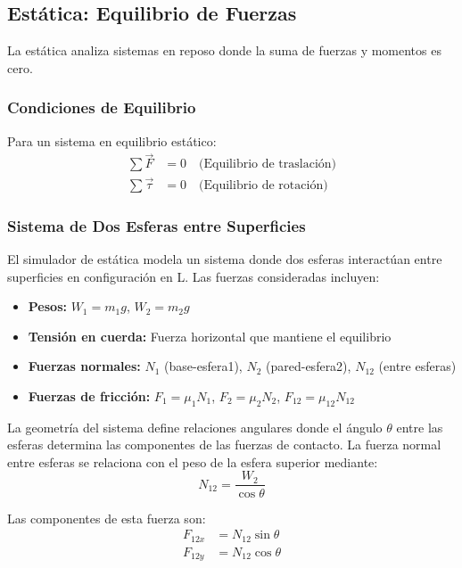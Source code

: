 \subsection{Estática: Equilibrio de Fuerzas}

La estática analiza sistemas en reposo donde la suma de fuerzas y momentos es cero.

\subsubsection{Condiciones de Equilibrio}
Para un sistema en equilibrio estático:
\begin{align}
\sum \vec{F} &= 0 \quad \text{(Equilibrio de traslación)} \\
\sum \vec{\tau} &= 0 \quad \text{(Equilibrio de rotación)}
\end{align}

\subsubsection{Sistema de Dos Esferas entre Superficies}
El simulador de estática modela un sistema donde dos esferas interactúan entre superficies en configuración en L. Las fuerzas consideradas incluyen:

\begin{itemize}
    \item \textbf{Pesos:} $W_1 = m_1 g$, $W_2 = m_2 g$
    \item \textbf{Tensión en cuerda:} Fuerza horizontal que mantiene el equilibrio
    \item \textbf{Fuerzas normales:} $N_1$ (base-esfera1), $N_2$ (pared-esfera2), $N_{12}$ (entre esferas)
    \item \textbf{Fuerzas de fricción:} $F_1 = \mu_1 N_1$, $F_2 = \mu_2 N_2$, $F_{12} = \mu_{12} N_{12}$
\end{itemize}

La geometría del sistema define relaciones angulares donde el ángulo $\theta$ entre las esferas determina las componentes de las fuerzas de contacto. La fuerza normal entre esferas se relaciona con el peso de la esfera superior mediante:
\begin{equation}
N_{12} = \frac{W_2}{\cos\theta}
\end{equation}

Las componentes de esta fuerza son:
\begin{align}
F_{12x} &= N_{12} \sin\theta \\
F_{12y} &= N_{12} \cos\theta
\end{align}

